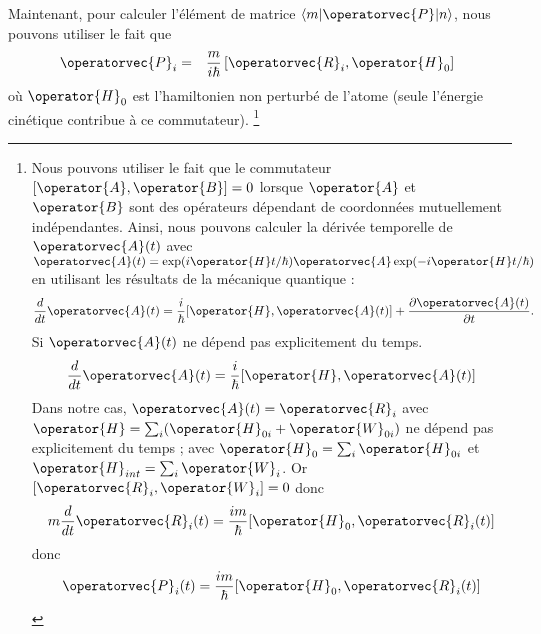 Maintenant, pour calculer l'élément de matrice $\langle m|\operatorvec{P}|n\rangle$, 
nous pouvons utiliser le fait que 
\begin{eqnarray}
	\operatorvec{P}_i & = & \frac{m}{i\hbar} \left [ \operatorvec{R}_i , \operator{H}_0 \right ] \label{eq:time_derivative_P}	
\end{eqnarray}
où $\operator{H}_0$ est l'hamiltonien non perturbé de l’atome (seule l'énergie cinétique contribue à ce commutateur).
\footnote{
Nous pouvons utiliser le fait que le commutateur $[\operator{A}, \operator{B}] = 0$ lorsque $\operator{A}$ et $\operator{B}$ sont des opérateurs dépendant de coordonnées mutuellement indépendantes. Ainsi, nous pouvons calculer la dérivée temporelle de $\operatorvec{A}(t)$ avec $\operatorvec{A}(t) = \exp(i\operator{H}t/\hbar) \operatorvec{A} \exp(-i\operator{H}t/\hbar)$ en utilisant les résultats de la mécanique quantique :
\begin{equation}
\frac{d}{dt} \operatorvec{A}(t) = \frac{i}{\hbar} [\operator{H}, \operatorvec{A}(t)] + \frac{\partial \operatorvec{A}(t)}{\partial t}.
\end{equation}
Si $\operatorvec{A}(t)$ ne dépend pas explicitement du temps.
\begin{equation}
\frac{d}{dt} \operatorvec{A}(t) = \frac{i}{\hbar} [\operator{H}, \operatorvec{A}(t)] 
\end{equation} 
Dans notre cas, $\operatorvec{A}(t) = \operatorvec{R}_i$ avec $\operator{H} = \sum_i ( \operator{H}_{0i} + \operator{W}_{0i})$ ne dépend pas explicitement du temps ; avec $\operator{H}_{0} = \sum_i \operator{H}_{0i}$ et $\operator{H}_{int} = \sum_i \operator{W}_{i}$. Or $[ \operatorvec{R}_i , \operator{W}_i ] = 0 $  donc
\begin{equation}
m \frac{d}{dt} \operatorvec{R}_i (t) = \frac{im}{\hbar} [\operator{H}_0, \operatorvec{R}_i(t)] 
\end{equation}
donc 
\begin{equation}
\operatorvec{P}_i (t) = \frac{im}{\hbar} [\operator{H}_0, \operatorvec{R}_i(t)] 
\end{equation}
}

